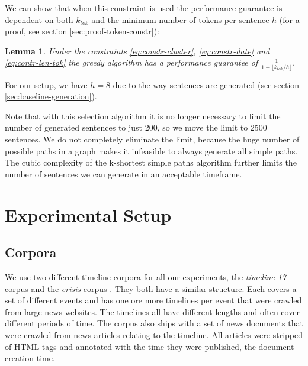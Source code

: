 \documentclass[a4paper,BCOR=10mm]{report}
\newtheorem{lemma}{Lemma}
\numberwithin{lemma}{chapter}
\numberwithin{definition}{chapter}
\begin{document}
We can show that when this constraint is used the performance guarantee is dependent on both $k_{tok}$ and the minimum number of tokens per sentence $h$ (for a proof, see section \ref{sec:proof-token-constr}):
\begin{lemma}
Under the constraints \ref{eq:constr-cluster}, \ref{eq:constr-date} and \ref{eq:contr-len-tok} the greedy algorithm has a performance guarantee of $\frac{1}{1 + \lfloor k_{\mathit{tok}} / h \rfloor}$.
\end{lemma}

For our setup, we have $h = 8$ due to the way sentences are generated (see section \ref{sec:baseline-generation}).





Note that with this selection algorithm it is no longer necessary to limit the number of generated sentences to just 200, so we move the limit to 2500 sentences.
We do not completely eliminate the limit, because the huge number of possible paths in a graph makes it infeasible to always generate all simple paths. The cubic complexity of the k-shortest simple paths algorithm further limits the number of sentences we can generate in an acceptable timeframe.

\chapter{Experimental Setup} \label{sec:setup}

\section{Corpora} \label{sec:corpora}

We use two different timeline corpora for all our experiments, the \textit{timeline 17} corpus \citep{tran-tl17} and the \textit{crisis} corpus \citep{tran-headline}. They both have a similar structure. Each covers a set of different events and has one ore more timelines per event that were crawled from large news websites. The timelines all have different lengths and often cover different periods of time. The corpus also ships with a set of news documents that were crawled from news articles relating to the timeline. All articles were stripped of HTML tags and annotated with the time they were published, the document creation time.
\end{document}
